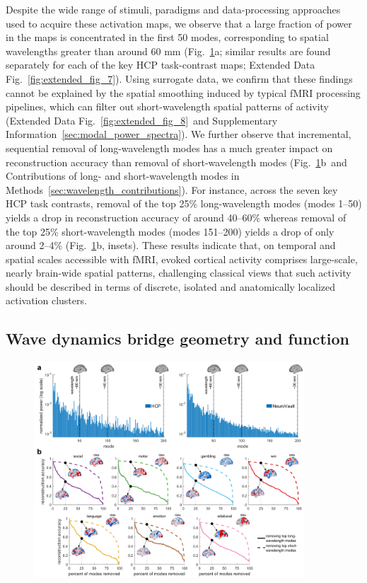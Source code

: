 \documentclass[sn-mathphys-num]{sn-jnl}%
\theoremstyle{thmstyleone}%
\theoremstyle{thmstyletwo}%
\theoremstyle{thmstylethree}%
\begin{document}
Despite the wide range of stimuli, paradigms and data-processing approaches used to acquire these activation maps, we observe that a large fraction of power in the maps is concentrated in the first 50 modes, corresponding to spatial wavelengths greater than around 60 mm (Fig.~\ref{fig:3}a; similar results are found separately for each of the key HCP task-contrast maps; Extended Data Fig.~\ref{fig:extended_fig_7}). 
Using surrogate data, we confirm that these findings cannot be explained by the spatial smoothing  induced by typical fMRI processing pipelines, which can filter out short-wavelength spatial patterns of activity (Extended Data Fig.~\ref{fig:extended_fig_8}~and Supplementary Information~\ref{sec:modal_power_spectra}). 
We further observe that incremental, sequential removal of long-wavelength modes has a much greater impact on reconstruction accuracy than removal of short-wavelength modes (Fig.~\ref{fig:3}b~and Contributions of long- and short-wavelength modes in Methods~\ref{sec:wavelength_contributions}). 
For instance, across the seven key HCP task contrasts, removal of the top 25\% long-wavelength modes (modes 1–50) yields a drop in reconstruction accuracy of around 40–60\% whereas removal of the top 25\% short-wavelength modes (modes 151–200) yields a drop of only around 2–4\% (Fig.~\ref{fig:3}b, insets). 
These results indicate that, on temporal and spatial scales accessible with fMRI, evoked cortical activity comprises large-scale, nearly brain-wide spatial patterns, challenging classical views that such activity should be described in terms of discrete, isolated and anatomically localized activation clusters.


\subsection{Wave dynamics bridge geometry and function}


\begin{figure}[!htb]
	\centering
	\includegraphics[width=0.9\textwidth]{fig/fig_3.pdf}
	\caption{
	} \label{fig:3}
\end{figure}
\end{document}
